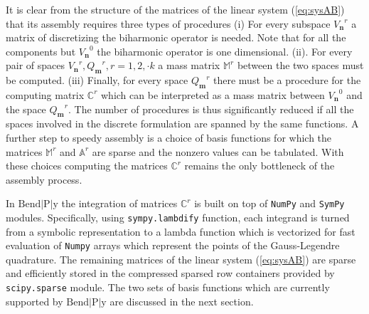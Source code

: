 \documentclass{marine_2015}
\newcommand{\Vh}{\ensuremath{V_{\mathbf{n}}}}
\newcommand{\Qh}{\ensuremath{Q_{\mathbf{m}}}}
\begin{document}
It is clear from the structure of the matrices of the linear system
(\ref{eq:sysAB}) that its assembly requires three types of procedures (i) For 
every subspace $\Vh^r$ a matrix of discretizing the biharmonic operator is needed.
Note that for all the components but $\Vh^0$ the biharmonic operator is one 
dimensional. (ii). For every pair of spaces $\Vh^r, \Qh^r, r=1,2,\cdot k$ a mass
matrix $\mathbb{M}^r$ between the two spaces must be computed. (iii) Finally, for
every space $\Qh^r$ there must be a procedure for the computing matrix $\mathbb{C}^r$
which can be interpreted as a mass matrix between $\Vh^0$ and the space
$\Qh^r$. The number of procedures is thus significantly reduced if all the
spaces involved in the discrete formulation are spanned by the same functions. A
further step to speedy assembly is a choice of basis functions for which the
matrices $\mathbb{M}^r$ and $\mathbb{A}^r$ are sparse and the nonzero values can
be tabulated. With these choices computing the matrices $\mathbb{C}^r$ remains the
only bottleneck of the assembly process. 

In $\text{Bend}\!\left|\text{P}\right|\!\text{y}$ the integration of matrices $\mathbb{C}^r$ is built on top of
{\tt{NumPy}}\cite{numpy} and {\tt{SymPy}}\cite{sympy} modules. Specifically, using
{\tt{sympy.lambdify}} function, each integrand is turned from a symbolic representation 
to a lambda function which is vectorized for fast evaluation of {\tt{Numpy}}
arrays which represent the points of the Gauss-Legendre quadrature. The remaining
matrices of the linear system (\ref{eq:sysAB}) are sparse and efficiently stored
in the compressed sparsed row containers provided by {\tt{scipy.sparse}} module.
The two sets of basis functions which are currently supported by $\text{Bend}\!\left|\text{P}\right|\!\text{y}$
are discussed in the next section.
\end{document}
